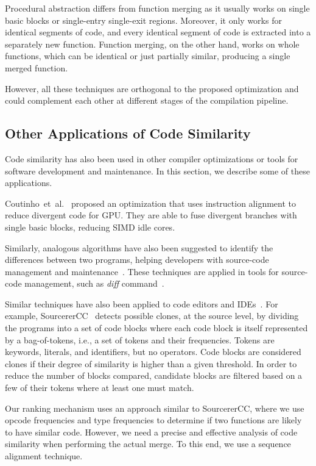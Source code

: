 Procedural abstraction differs from function merging as it usually works on
single basic blocks or single-entry single-exit regions.
Moreover, it only works for identical segments of code, and every identical
segment of code is extracted into a separately new function.
Function merging, on the other hand, works on whole functions, which can be
identical or just partially similar, producing a single merged function.

However, all these techniques are orthogonal to the proposed optimization and
could complement each other at different stages of the compilation pipeline.

\subsection{Other Applications of Code Similarity}

Code similarity has also been used in other compiler optimizations or tools for
software development and maintenance.
In this section, we describe some of these applications.

Coutinho~et~al.~\cite{coutinho11} proposed an optimization that uses instruction
alignment to reduce divergent code for GPU.
They are able to fuse divergent branches with single basic blocks, reducing
SIMD idle cores.

Similarly, analogous algorithms have also been suggested to identify the
differences between two programs, helping developers with source-code
management and maintenance~\cite{yang91,miller85}.
These techniques are applied in tools for source-code management, such as
\textit{diff} command~\cite{miller85}.

Similar techniques have also been applied to code editors and IDEs~\cite{toomim04,sajnani16}.
For example,
SourcererCC~\cite{sajnani16} detects possible clones, at the source level, by
dividing the programs into a set of code blocks where each code block is itself
represented by a bag-of-tokens, i.e., a set of tokens and their frequencies.
Tokens are keywords, literals, and identifiers, but no operators.
Code blocks are considered clones if their degree of similarity is higher than
a given threshold.
In order to reduce the number of blocks compared, candidate blocks are filtered
based on a few of their tokens where at least one must match.

Our ranking mechanism uses an approach similar to SourcererCC, where we use
opcode frequencies and type frequencies to determine if two functions are
likely to have similar code.
However, we need a precise and effective analysis of code similarity when
performing the actual merge.
To this end, we use a sequence alignment technique.

